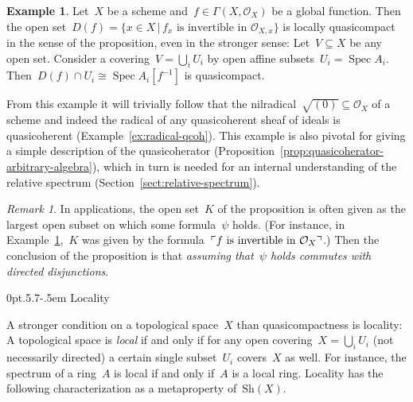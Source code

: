\documentclass[10pt,reqno,a4paper]{amsbook}
\makeatletter
\theoremstyle{definition}
\newtheorem{ex}[defn]{Example}
\theoremstyle{plain}
\theoremstyle{remark}
\newtheorem{rem}[defn]{Remark}
\renewcommand{\O}{\mathcal{O}}
\newcommand{\Sh}{\mathrm{Sh}}
\DeclareMathOperator{\Spec}{Spec}
\newcommand{\?}{\,{:}\,}
\renewcommand{\_}{\mathpunct{.}\,}
\newcommand{\speak}[1]{\ulcorner\text{\textnormal{#1}}\urcorner}
\def\subsection{\@startsection{subsection}{2}%
  {0pt}{.5\linespacing\@plus.7\linespacing}{-.5em}%
  {\normalfont\bfseries}}
\makeatother
\begin{document}
\begin{ex}\label{ex:df-locally-compact}
Let~$X$ be a scheme and~$f \in \Gamma(X,\O_X)$ be a global function.
Then the open set~$D(f) = \{ x \in X \,|\, \text{$f_x$ is invertible in~$\O_{X,x}$}
\}$ is locally quasicompact in the sense of the proposition, even in the
stronger sense: Let~$V \subseteq X$ be any open set. Consider a covering~$V = \bigcup_i
U_i$ by open affine subsets~$U_i = \Spec A_i$. Then~$D(f) \cap U_i \cong \Spec
A_i[f^{-1}]$ is quasicompact.\end{ex}

From this example it will trivially follow that the nilradical~$\sqrt{(0)}
\subseteq \O_X$ of a scheme and indeed the radical of any quasicoherent
sheaf of ideals is quasicoherent (Example~\ref{ex:radical-qcoh}). This example is also
pivotal for giving a simple description of the quasicoherator
(Proposition~\ref{prop:quasicoherator-arbitrary-algebra}), which in turn is
needed for an internal understanding of the relative
spectrum (Section~\ref{sect:relative-spectrum}).

\begin{rem}In applications, the open set~$K$ of the proposition is often given
as the largest open subset on which some formula~$\psi$ holds. (For instance,
in Example~\ref{ex:df-locally-compact},~$K$ was given by the formula~$\speak{$f$
is invertible in $\O_X$}$.)
Then the conclusion of the proposition is that \emph{assuming that~$\psi$ holds commutes
with directed disjunctions}.\end{rem}


\subsection{Locality}

A stronger condition on a topological space~$X$ than quasicompactness is
locality: A topological space is \emph{local} if and only if for any open
covering~$X = \bigcup_i U_i$ (not necessarily directed) a certain single subset~$U_i$
covers~$X$ as well. For instance, the spectrum of a ring~$A$ is local if and only
if~$A$ is a local ring. Locality has the following characterization as a metaproperty
of~$\Sh(X)$.
\end{document}
